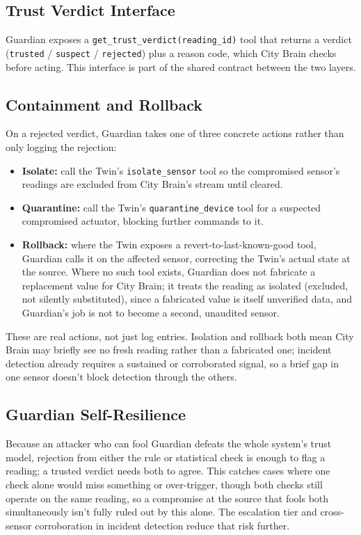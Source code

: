 \documentclass[10pt,letterpaper]{article}
\begin{document}
\subsection{Trust Verdict Interface}

Guardian exposes a \texttt{get\_trust\_verdict(reading\_id)} tool that returns a verdict (\texttt{trusted} / \texttt{suspect} / \texttt{rejected}) plus a reason code, which City Brain checks before acting. This interface is part of the shared contract between the two layers.

\subsection{Containment and Rollback}

On a rejected verdict, Guardian takes one of three concrete actions rather than only logging the rejection:

\begin{itemize}[leftmargin=*]
\item \textbf{Isolate:} call the Twin's \texttt{isolate\_sensor} tool so the compromised sensor's readings are excluded from City Brain's stream until cleared.
\item \textbf{Quarantine:} call the Twin's \texttt{quarantine\_device} tool for a suspected compromised actuator, blocking further commands to it.
\item \textbf{Rollback:} where the Twin exposes a revert-to-last-known-good tool, Guardian calls it on the affected sensor, correcting the Twin's actual state at the source. Where no such tool exists, Guardian does not fabricate a replacement value for City Brain; it treats the reading as isolated (excluded, not silently substituted), since a fabricated value is itself unverified data, and Guardian's job is not to become a second, unaudited sensor.
\end{itemize}

These are real actions, not just log entries. Isolation and rollback both mean City Brain may briefly see no fresh reading rather than a fabricated one; incident detection already requires a sustained or corroborated signal, so a brief gap in one sensor doesn't block detection through the others.

\subsection{Guardian Self-Resilience}

Because an attacker who can fool Guardian defeats the whole system's trust model, rejection from either the rule or statistical check is enough to flag a reading; a trusted verdict needs both to agree. This catches cases where one check alone would miss something or over-trigger, though both checks still operate on the same reading, so a compromise at the source that fools both simultaneously isn't fully ruled out by this alone. The escalation tier and cross-sensor corroboration in incident detection reduce that risk further.
\end{document}

